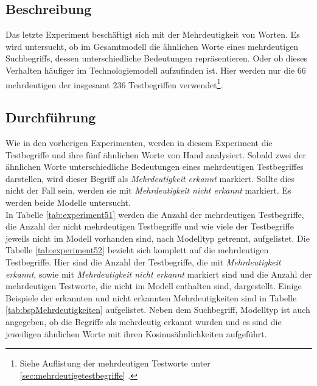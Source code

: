 \documentclass[12pt,a4paper]{report}
\begin{document}
\label{chap:Experiment5}
		\subsection*{Beschreibung}
		Das letzte Experiment beschäftigt sich mit der Mehrdeutigkeit von Worten. Es wird untersucht, ob im Gesamtmodell die ähnlichen Worte eines mehrdeutigen Suchbegriffs, dessen unterschiedliche Bedeutungen repräsentieren. Oder ob dieses Verhalten häufiger im Technologiemodell aufzufinden ist.
		Hier werden nur die 66 mehrdeutigen der insgesamt 236 Testbegriffen verwendet\footnote{Siehe Auflistung der mehrdeutigen Testworte unter \ref{sec:mehrdeutigetestbegriffe} .}. \\
		
		
		\subsection*{Durchführung}
Wie in den vorherigen Experimenten, werden in diesem Experiment die Testbegriffe und ihre fünf ähnlichen Worte von Hand analysiert. Sobald zwei der ähnlichen Worte unterschiedliche Bedeutungen eines mehrdeutigen Testbegriffes darstellen, wird dieser Begriff als \textit{Mehrdeutigkeit erkannt} markiert. Sollte dies nicht der Fall sein, werden sie mit \textit{Mehrdeutigkeit nicht erkannt} markiert. Es werden beide Modelle untersucht.\\
In Tabelle \ref{tab:experiment51} werden die Anzahl der mehrdeutigen Testbegriffe, die Anzahl der nicht mehrdeutigen Testbegriffe und wie viele der Testbegriffe jeweils nicht im Modell vorhanden sind, nach Modelltyp getrennt, aufgelistet. Die Tabelle \ref{tab:experiment52} bezieht sich komplett auf die mehrdeutigen Testbegriffe. Hier sind die Anzahl der Testbegriffe, die mit \textit{Mehrdeutigkeit erkannt}, sowie mit \textit{Mehrdeutigkeit nicht erkannt} markiert sind und die Anzahl der mehrdeutigen Testworte, die nicht im Modell enthalten sind, dargestellt. Einige Beispiele der erkannten und nicht erkannten Mehrdeutigkeiten sind in Tabelle \ref{tab:bspMehrdeutigkeiten} aufgelistet. Neben dem Suchbegriff, Modelltyp ist auch angegeben, ob die Begriffe als mehrdeutig erkannt wurden und es sind die jeweiligen ähnlichen Worte mit ihren Kosinusähnlichkeiten aufgeführt. \\
\end{document}
